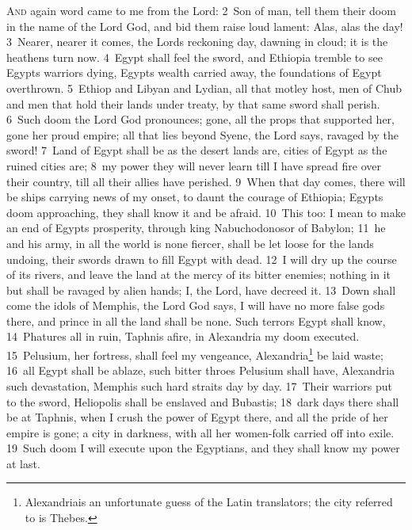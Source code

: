 \documentclass[10pt]{book} %
\begin{document}
\lettrine[lines=2]{A}{nd} again word came to me from the Lord: \textcolor{benred8}{2}~Son of man, tell them their doom in the name of the Lord God, and bid them raise loud lament: Alas, alas the day! \textcolor{benred8}{3}~Nearer, nearer it comes, the Lord\textquotesingle s reckoning day, dawning in cloud; it is the heathen\textquotesingle s turn now. \textcolor{benred8}{4}~Egypt shall feel the sword, and Ethiopia tremble to see Egypt\textquotesingle s warriors dying, Egypt\textquotesingle s wealth carried away, the foundations of Egypt overthrown. \textcolor{benred8}{5}~Ethiop and Libyan and Lydian, all that motley host, men of Chub and men that hold their lands under treaty, by that same sword shall perish. \textcolor{benred8}{6}~Such doom the Lord God pronounces; gone, all the props that supported her, gone her proud empire; all that lies beyond Syene, the Lord says, ravaged by the sword! \textcolor{benred8}{7}~Land of Egypt shall be as the desert lands are, cities of Egypt as the ruined cities are; \textcolor{benred8}{8}~my power they will never learn till I have spread fire over their country, till all their allies have perished. \textcolor{benred8}{9}~When that day comes, there will be ships carrying news of my onset, to daunt the courage of Ethiopia; Egypt\textquotesingle s doom approaching, they shall know it and be afraid.
\textcolor{benred8}{10}~This too: I mean to make an end of Egypt\textquotesingle s prosperity, through king Nabuchodonosor of Babylon; \textcolor{benred8}{11}~he and his army, in all the world is none fiercer, shall be let loose for the land\textquotesingle s undoing, their swords drawn to fill Egypt with dead. \textcolor{benred8}{12}~I will dry up the course of its rivers, and leave the land at the mercy of its bitter enemies; nothing in it but shall be ravaged by alien hands; I, the Lord, have decreed it. \textcolor{benred8}{13}~Down shall come the idols of Memphis, the Lord God says, I will have no more false gods there, and prince in all the land shall be none. Such terrors Egypt shall know, \textcolor{benred8}{14}~Phatures all in ruin, Taphnis afire, in Alexandria my doom executed. \textcolor{benred8}{15}~Pelusium, her fortress, shall feel my vengeance, Alexandria\footnote[1]{\textasciigrave Alexandria\textquotesingle  is an unfortunate guess of the Latin translators; the city referred to is Thebes.} be laid waste; \textcolor{benred8}{16}~all Egypt shall be ablaze, such bitter throes Pelusium shall have, Alexandria such devastation, Memphis such hard straits day by day. \textcolor{benred8}{17}~Their warriors put to the sword, Heliopolis shall be enslaved and Bubastis; \textcolor{benred8}{18}~dark days there shall be at Taphnis, when I crush the power of Egypt there, and all the pride of her empire is gone; a city in darkness, with all her women-folk carried off into exile. \textcolor{benred8}{19}~Such doom I will execute upon the Egyptians, and they shall know my power at last.
\end{document}
